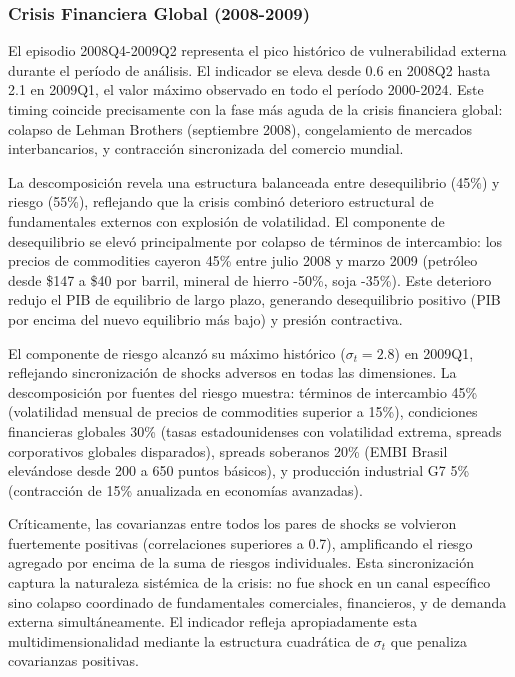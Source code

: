 \documentclass[3p,11pt,draft,natbib=false]{elsarticle}
\begin{document}
\subsubsection{Crisis Financiera Global (2008-2009)}

El episodio 2008Q4-2009Q2 representa el pico histórico de vulnerabilidad externa durante el período de análisis. El indicador se eleva desde 0.6 en 2008Q2 hasta 2.1 en 2009Q1, el valor máximo observado en todo el período 2000-2024. Este timing coincide precisamente con la fase más aguda de la crisis financiera global: colapso de Lehman Brothers (septiembre 2008), congelamiento de mercados interbancarios, y contracción sincronizada del comercio mundial.

La descomposición revela una estructura balanceada entre desequilibrio (45\%) y riesgo (55\%), reflejando que la crisis combinó deterioro estructural de fundamentales externos con explosión de volatilidad. El componente de desequilibrio se elevó principalmente por colapso de términos de intercambio: los precios de commodities cayeron 45\% entre julio 2008 y marzo 2009 (petróleo desde \$147 a \$40 por barril, mineral de hierro -50\%, soja -35\%). Este deterioro redujo el PIB de equilibrio de largo plazo, generando desequilibrio positivo (PIB por encima del nuevo equilibrio más bajo) y presión contractiva.

El componente de riesgo alcanzó su máximo histórico ($\sigma_t = 2.8$) en 2009Q1, reflejando sincronización de shocks adversos en todas las dimensiones. La descomposición por fuentes del riesgo muestra: términos de intercambio 45\% (volatilidad mensual de precios de commodities superior a 15\%), condiciones financieras globales 30\% (tasas estadounidenses con volatilidad extrema, spreads corporativos globales disparados), spreads soberanos 20\% (EMBI Brasil elevándose desde 200 a 650 puntos básicos), y producción industrial G7 5\% (contracción de 15\% anualizada en economías avanzadas).

Críticamente, las covarianzas entre todos los pares de shocks se volvieron fuertemente positivas (correlaciones superiores a 0.7), amplificando el riesgo agregado por encima de la suma de riesgos individuales. Esta sincronización captura la naturaleza sistémica de la crisis: no fue shock en un canal específico sino colapso coordinado de fundamentales comerciales, financieros, y de demanda externa simultáneamente. El indicador refleja apropiadamente esta multidimensionalidad mediante la estructura cuadrática de $\sigma_t$ que penaliza covarianzas positivas.
\end{document}
